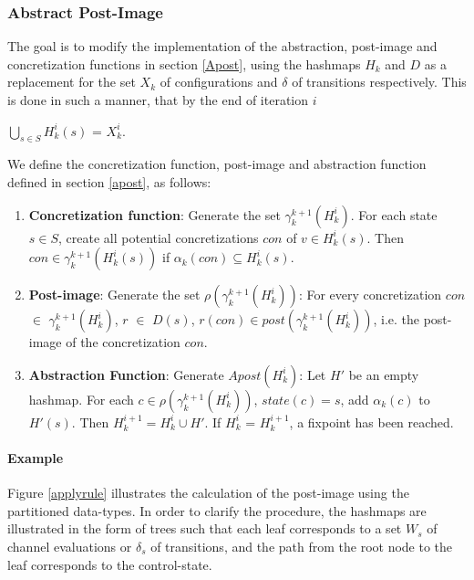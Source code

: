 \subsubsection{Abstract Post-Image}
The goal is to modify the implementation of the abstraction, post-image and concretization functions in section \ref{Apost}, using the hashmaps $H_k$ and $D$ as a replacement for the set $X_k$ of configurations and $\delta$ of transitions respectively. This is done in such a manner, that by the end of iteration $i$

$\bigcup\limits_{s \in S} H_k^i(s)$ = $X_k^i$.

We define the concretization function, post-image and abstraction function defined in section \ref{apost}, as follows:

\begin{enumerate}
\item
\textbf{Concretization function}:
Generate the set $\gamma_k^{k+1}(H_k^i)$. For each state $s \in S$, create all potential concretizations $con$ of $v \in H_k^i(s)$. Then $con \in \gamma_k^{k+1}(H_k^i(s))$ if $\alpha_k(con) \subseteq H_k^i(s)$.

\item
\textbf{Post-image}:
Generate the set $\rho(\gamma_k^{k+1}(H_k^i))$: For every concretization $con$ $\in$ $\gamma_k^{k+1}(H_k^i)$, $r$ $\in$ $D(s)$, $r(con) \in post(\gamma_k^{k+1}(H_k^i))$, i.e. the post-image of the concretization $con$.

\item
\textbf{Abstraction Function}:
Generate $Apost(H_k^i)$: Let $H'$ be an empty hashmap. For each $c \in \rho(\gamma_k^{k+1}(H_k^i))$, $state(c) = s$,  add $\alpha_k(c)$ to $H'(s)$. Then $H_k^{i+1} = H_k^i \cup H'$. If $H_k^i$ = $H_k^{i+1}$, a fixpoint has been reached.
\end{enumerate}

\paragraph{Example}

Figure \ref{applyrule} illustrates the calculation of the post-image using the partitioned data-types. In order to clarify the procedure, the hashmaps are illustrated in the form of trees such that each leaf corresponds to a set $W_s$ of channel evaluations or $\delta_s$ of transitions, and the path from the root node to the leaf corresponds to the control-state.



